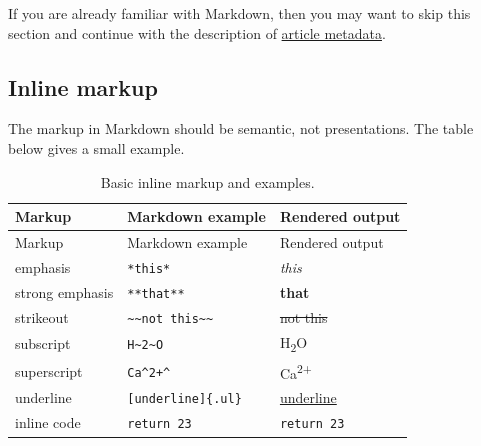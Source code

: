 \documentclass[10pt,a4paper,onecolumn]{article}
\begin{document}
If you are already familiar with Markdown, then you may want to skip
this section and continue with the description of
\hyperref[article-metadata]{article metadata}.

\subsection{Inline markup}\label{inline-markup}

The markup in Markdown should be semantic, not presentations. The table
below gives a small example.

\begin{longtable}[]{@{}
  >{\raggedright\arraybackslash}p{}
  >{\centering\arraybackslash}p{}
  >{\centering\arraybackslash}p{}@{}}
\caption{Basic inline markup and examples.}\tabularnewline
\toprule\noalign{}
\begin{minipage}[b]{\linewidth}\raggedright
Markup
\end{minipage} & \begin{minipage}[b]{\linewidth}\centering
Markdown example
\end{minipage} & \begin{minipage}[b]{\linewidth}\centering
Rendered output
\end{minipage} \\
\midrule\noalign{}
\endfirsthead
\toprule\noalign{}
\begin{minipage}[b]{\linewidth}\raggedright
Markup
\end{minipage} & \begin{minipage}[b]{\linewidth}\centering
Markdown example
\end{minipage} & \begin{minipage}[b]{\linewidth}\centering
Rendered output
\end{minipage} \\
\midrule\noalign{}
\endhead
\bottomrule\noalign{}
\endlastfoot
emphasis & \texttt{*this*} & \emph{this} \\
strong emphasis & \texttt{**that**} & \textbf{that} \\
strikeout &
\texttt{\textasciitilde{}\textasciitilde{}not\ this\textasciitilde{}\textasciitilde{}}
& \st{not this} \\
subscript & \texttt{H\textasciitilde{}2\textasciitilde{}O} &
H\textsubscript{2}O \\
superscript & \texttt{Ca\^{}2+\^{}} & Ca\textsuperscript{2+} \\
underline & \texttt{{[}underline{]}\{.ul\}} & \ul{underline} \\
inline code & \texttt{\textasciigrave{}return\ 23\textasciigrave{}} &
\texttt{return\ 23} \\
\end{longtable}
\end{document}
